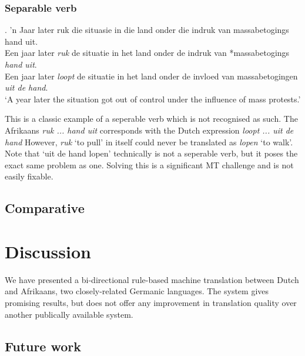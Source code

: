 \documentclass[11pt]{article}
\begin{document}
\subsubsection{Separable verb}

\ex. \label{ex:exsepverb} 
    'n Jaar later ruk die situasie in die land onder die indruk van massabetogings hand uit. \\
    Een jaar later {\em *ruk} de situatie in het land onder de indruk van *massabetogings {\em hand uit}. \\
    Een jaar later {\em loopt} de situatie in het land onder de invloed van massabetogingen {\em uit de hand}. \\
    `A year later the situation got out of control under the influence of mass protests.'

This is a classic example of a seperable verb which is not recognised as such. The 
Afrikaans \emph{ruk ... hand uit} corresponds with the Dutch expression
\emph{loopt ... uit de hand} However, \emph{ruk} `to pull' in itself 
could never be translated as \emph{lopen} `to walk'. Note that `uit de hand lopen' 
 technically is not a seperable verb, but it poses the exact same problem as one.
Solving this is a significant MT challenge and is not easily fixable.  

\subsection{Comparative}



\section{Discussion}

We have presented a bi-directional rule-based machine translation between Dutch and Afrikaans, 
two closely-related Germanic languages. The system gives promising results, but does not offer
any improvement in translation quality over another publically available system. 

\subsection{Future work}
\end{document}

